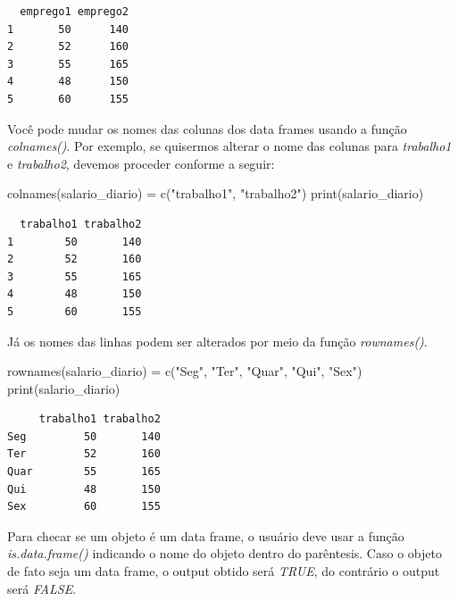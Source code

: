 \documentclass[
  letterpaper,
  DIV=11,
  numbers=noendperiod]{scrreprt}
\newenvironment{Shaded}{\begin{snugshade}}{\end{snugshade}}
\newcommand{\FunctionTok}[1]{\textcolor[rgb]{0.28,0.35,0.67}{#1}}
\newcommand{\NormalTok}[1]{\textcolor[rgb]{0.00,0.23,0.31}{#1}}
\newcommand{\OtherTok}[1]{\textcolor[rgb]{0.00,0.23,0.31}{#1}}
\newcommand{\StringTok}[1]{\textcolor[rgb]{0.13,0.47,0.30}{#1}}
\begin{document}
\begin{verbatim}
  emprego1 emprego2
1       50      140
2       52      160
3       55      165
4       48      150
5       60      155
\end{verbatim}

Você pode mudar os nomes das colunas dos data frames usando a função
\emph{colnames()}. Por exemplo, se quisermos alterar o nome das colunas
para \emph{trabalho1} e \emph{trabalho2}, devemos proceder conforme a
seguir:

\begin{Shaded}
\begin{Highlighting}[]
\FunctionTok{colnames}\NormalTok{(salario\_diario) }\OtherTok{=} \FunctionTok{c}\NormalTok{(}\StringTok{"trabalho1"}\NormalTok{, }\StringTok{"trabalho2"}\NormalTok{)}
\FunctionTok{print}\NormalTok{(salario\_diario)}
\end{Highlighting}
\end{Shaded}

\begin{verbatim}
  trabalho1 trabalho2
1        50       140
2        52       160
3        55       165
4        48       150
5        60       155
\end{verbatim}

Já os nomes das linhas podem ser alterados por meio da função
\emph{rownames()}.

\begin{Shaded}
\begin{Highlighting}[]
\FunctionTok{rownames}\NormalTok{(salario\_diario) }\OtherTok{=} \FunctionTok{c}\NormalTok{(}\StringTok{"Seg"}\NormalTok{, }\StringTok{"Ter"}\NormalTok{, }\StringTok{"Quar"}\NormalTok{, }\StringTok{"Qui"}\NormalTok{, }\StringTok{"Sex"}\NormalTok{)}
\FunctionTok{print}\NormalTok{(salario\_diario)}
\end{Highlighting}
\end{Shaded}

\begin{verbatim}
     trabalho1 trabalho2
Seg         50       140
Ter         52       160
Quar        55       165
Qui         48       150
Sex         60       155
\end{verbatim}

Para checar se um objeto é um data frame, o usuário deve usar a função
\emph{is.data.frame()} indicando o nome do objeto dentro do parêntesis.
Caso o objeto de fato seja um data frame, o output obtido será
\emph{TRUE}, do contrário o output será \emph{FALSE}.
\end{document}
